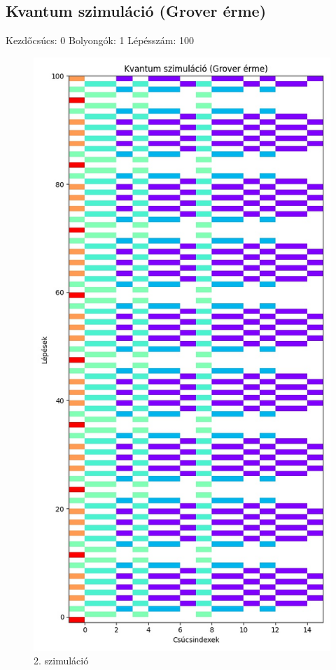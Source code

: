 \documentclass[14pt,a4paper]{article}
\begin{document}
\subsection{Kvantum szimuláció (Grover érme)}
Kezdőcsúcs: 0
Bolyongók: 1
Lépésszám: 100
\begin{figure}[H]
\centering
\includegraphics[width = 0.7\columnwidth]{sim_02/counts.jpg}
\caption{2. szimuláció}
\end{figure}
\end{document}
